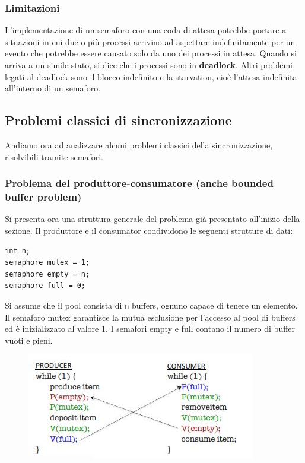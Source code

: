 \documentclass[a4paper]{article}
\begin{document}
\subsubsection{Limitazioni}
L'implementazione di un semaforo con una coda di attesa potrebbe portare a situazioni in cui due o più processi arrivino ad aspettare indefinitamente per un evento che potrebbe essere causato solo da uno dei processi in attesa. Quando si arriva a un simile stato, si dice che i processi sono in \textbf{deadlock}. Altri problemi legati al deadlock sono il blocco indefinito e la starvation, cioè l'attesa indefinita all'interno di un semaforo.

\subsection{Problemi classici di sincronizzazione}
Andiamo ora ad analizzare alcuni problemi classici della sincronizzazione, risolvibili tramite semafori.

\subsubsection{Problema del produttore-consumatore (anche bounded buffer problem)}
Si presenta ora una struttura generale del problema già presentato all'inizio della sezione. Il produttore e il consumator condividono le seguenti strutture di dati:
\begin{verbatim}
int n;
semaphore mutex = 1;
semaphore empty = n;
semaphore full = 0;
\end{verbatim}

Si assume che il pool consista di \texttt n buffers, ognuno capace di tenere un elemento. Il semaforo mutex garantisce la mutua esclusione per l'accesso al pool di buffers ed è inizializzato al valore 1. I semafori empty e full contano il numero di buffer vuoti e pieni.
\begin{figure}[h!]
    \includegraphics{img/sem_prod_cons.JPG}
\end{figure}
\end{document}
